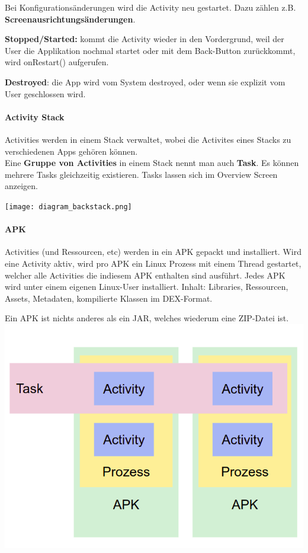 Bei Konfigurationsänderungen wird die Activity neu gestartet. Dazu zählen z.B. \textbf{Screenausrichtungsänderungen}.

\textbf{Stopped/Started:} kommt die Activity wieder in den Vordergrund, weil der User die Applikation nochmal startet oder mit dem Back-Button zurückkommt, wird onRestart() aufgerufen.

\textbf{Destroyed}: die App wird vom System destroyed, oder wenn sie explizit vom User geschlossen wird.

\paragraph{Activity Stack}

Activities werden in einem Stack verwaltet, wobei die Activites eines Stacks zu verschiedenen Apps gehören können.\\ 
Eine \textbf{Gruppe von Activities} in einem Stack nennt man auch \textbf{Task}. Es können mehrere Tasks gleichzeitig existieren. Tasks lassen sich im Overview Screen anzeigen.

\texttt{[image: diagram\_backstack.png]}


\paragraph{APK}

Activities (und Ressourcen, etc) werden in ein APK gepackt und installiert. Wird eine Activity aktiv, wird pro APK ein Linux Prozess mit einem Thread gestartet, welcher alle Activities die indiesem APK enthalten sind ausführt. Jedes APK wird unter einem eigenen Linux-User installiert. Inhalt: Libraries, Ressourcen, Assets, Metadaten, kompilierte Klassen im DEX-Format.

Ein APK ist nichts anderes als ein JAR, welches wiederum eine ZIP-Datei ist.
\includegraphics[scale=0.20]{img/activities-tasks-systemsicht.png}

